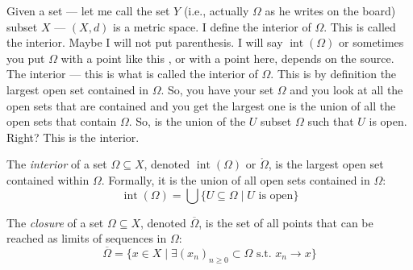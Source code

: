 
\begin{spoken-clean}[00:00:00 - 00:01:31]
 Given a set --- let me call the set $Y$ (i.e., actually $\Omega$ as he writes on the board) subset $X$ --- $(X, d)$ is a metric space. I define the interior of $\Omega$. This is called the interior. Maybe I will not put parenthesis. I will say $\operatorname{int}(\Omega)$ or sometimes you put $\Omega$ with a point like this , or with a point here, depends on the source. The interior --- this is what is called the interior of $\Omega$. This is by definition the largest open set contained in $\Omega$. So, you have your set $\Omega$ and you look at all the open sets that are contained and you get the largest one is the union of all the open sets that contain $\Omega$. So, is the union of the $U$ subset $\Omega$ such that $U$ is open. Right? This is the interior.
\end{spoken-clean}

\begin{math-stroke}
\setcounter{section}{2}
\setcounter{subsection}{0}
\setcounter{theorem}{45}
\begin{definition}[Interior]\label{def:interior-v2}
The \emph{interior} of a set $\Omega \subseteq X$, denoted $\operatorname{int}(\Omega)$ or $\mathring{\Omega}$, is the largest open set contained within $\Omega$. Formally, it is the union of all open sets contained in $\Omega$:
\[ \operatorname{int}(\Omega) = \bigcup \{ U \subseteq \Omega \mid U \text{ is open} \} \]
\end{definition}

\begin{definition}[Closure]\label{def:closure-v2}
The \emph{closure} of a set $\Omega \subseteq X$, denoted $\overline{\Omega}$, is the set of all points that can be reached as limits of sequences in $\Omega$:
\[ \overline{\Omega} = \{ x \in X \mid \exists (x_n)_{n \ge 0} \subset \Omega \text{ s.t. } x_n \to x \} \]
\end{definition}
\end{math-stroke}

